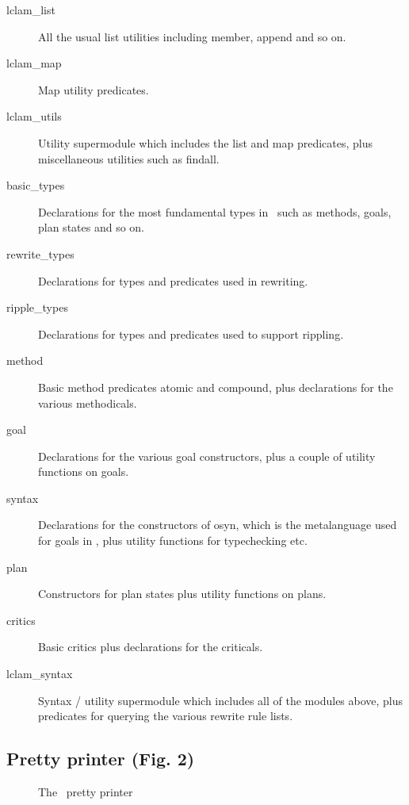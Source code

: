 \begin{description}
  
\item[lclam\_list] All the usual list utilities including member,
  append and so on.
\item[lclam\_map] Map utility predicates.
\item[lclam\_utils] Utility supermodule which includes the list and
  map predicates, plus miscellaneous utilities such as findall.
\item[basic\_types] Declarations for the most fundamental types in
  \lclam\ such as methods, goals, plan states and so on.
\item[rewrite\_types] Declarations for types and predicates used in rewriting.
\item[ripple\_types] Declarations for types and predicates used to support rippling.
\item[method] Basic method predicates atomic and compound, plus
  declarations for the various methodicals.
\item[goal] Declarations for the various goal constructors, plus a
  couple of utility functions on goals.
\item[syntax] Declarations for the constructors of osyn, which is the
  metalanguage used for goals in \lclam, plus utility functions for
  typechecking etc.
\item[plan] Constructors for plan states plus utility functions on plans.  
\item[critics] Basic critics plus declarations for the criticals.
\item[lclam\_syntax] Syntax / utility supermodule which includes all
  of the modules above, plus predicates for querying the various
  rewrite rule lists.
\end{description}

\subsection{Pretty printer (Fig. 2)}

\begin{figure}
\begin{center}
\end{center}
\caption{The \lclam\ pretty printer}
\end{figure}

